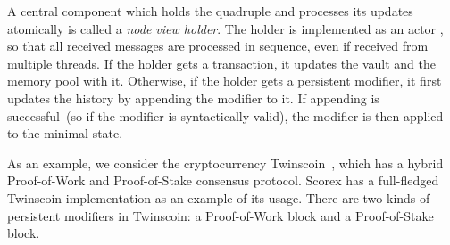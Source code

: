 A central component which holds the quadruple {\em <history, minimal state, vault, memory pool>} and processes its updates atomically is called a {\em node view holder}. The holder is implemented as an actor , so that all received messages are processed in sequence, even if received from multiple threads. If the holder gets a transaction, it updates the vault and the memory pool with it. Otherwise, if the holder gets a persistent modifier, it first updates the history by appending the modifier to it. If appending is successful~(so if the modifier is syntactically valid), the modifier is then applied to the minimal state.  

As an example, we consider the cryptocurrency Twinscoin~\cite{chepurnoy2017twinscoin}, which has a hybrid Proof-of-Work and Proof-of-Stake consensus protocol. Scorex has a full-fledged Twinscoin implementation as an example of its usage. There are two kinds of persistent modifiers in Twinscoin: a Proof-of-Work block and a Proof-of-Stake block. 
